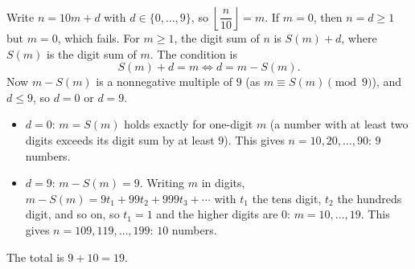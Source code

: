 Write $n=10m+d$ with $d\in\{0,\dots,9\}$, so $\left\lfloor\dfrac n{10}\right\rfloor=m$. If $m=0$, then $n=d\ge1$ but $m=0$, which fails. For $m\ge1$, the digit sum of $n$ is $S(m)+d$, where $S(m)$ is the digit sum of $m$. The condition is
\[S(m)+d=m\iff d=m-S(m).\]
Now $m-S(m)$ is a nonnegative multiple of $9$ (as $m\equiv S(m)\pmod9$), and $d\le9$, so $d=0$ or $d=9$.
\begin{itemize}
\item $d=0$: $m=S(m)$ holds exactly for one-digit $m$ (a number with at least two digits exceeds its digit sum by at least $9$). This gives $n=10,20,\dots,90$: $9$ numbers.
\item $d=9$: $m-S(m)=9$. Writing $m$ in digits, $m-S(m)=9t_1+99t_2+999t_3+\cdots$ with $t_1$ the tens digit, $t_2$ the hundreds digit, and so on, so $t_1=1$ and the higher digits are $0$: $m=10,\dots,19$. This gives $n=109,119,\dots,199$: $10$ numbers.
\end{itemize}
The total is $9+10=\boxed{19}$.

